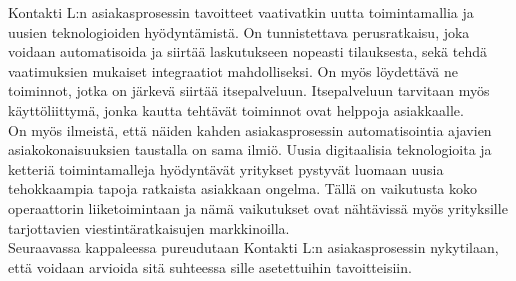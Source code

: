 \documentclass[finnish,12pt,a4paper,pdftex]{article}
\begin{document}

Kontakti L:n asiakasprosessin tavoitteet vaativatkin uutta toimintamallia ja uusien teknologioiden hyödyntämistä. On tunnistettava perusratkaisu, joka voidaan automatisoida ja siirtää laskutukseen nopeasti tilauksesta, sekä tehdä vaatimuksien mukaiset integraatiot mahdolliseksi. On myös löydettävä ne toiminnot, jotka on järkevä siirtää itsepalveluun. Itsepalveluun tarvitaan myös käyttöliittymä, jonka kautta tehtävät toiminnot ovat helppoja asiakkaalle.\\

On myös ilmeistä, että näiden kahden asiakasprosessin automatisointia ajavien asiakokonaisuuksien taustalla on sama ilmiö. Uusia digitaalisia teknologioita ja ketteriä toimintamalleja hyödyntävät yritykset pystyvät luomaan uusia tehokkaampia tapoja ratkaista asiakkaan ongelma. Tällä on vaikutusta koko operaattorin liiketoimintaan ja nämä vaikutukset ovat nähtävissä myös yrityksille tarjottavien viestintäratkaisujen markkinoilla. \\

Seuraavassa kappaleessa pureudutaan Kontakti L:n asiakasprosessin nykytilaan, että voidaan arvioida sitä suhteessa sille asetettuihin tavoitteisiin.



\end{document}
